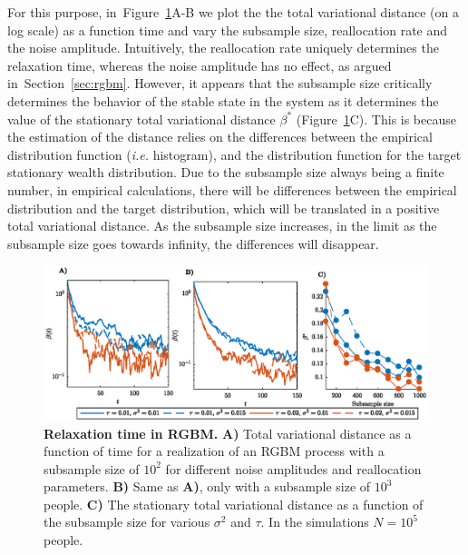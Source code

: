 \documentclass[11pt]{article}
\newcommand{\Sref}[1]{Section~\ref{sec:#1}}
\newcommand{\ie}{{\it i.e.}\xspace}
\newcommand{\Fref}[1]{Figure~\ref{fig:#1}}
\numberwithin{equation}{section}
\begin{document}
For this purpose, in~\Fref{rgbm-mixing-time}A-B we plot the the total variational distance (on a log scale)  as a function time and vary the subsample size, reallocation rate and the noise amplitude. Intuitively, the reallocation rate uniquely determines the relaxation time, whereas the noise amplitude has no effect, as argued in~\Sref{rgbm}. However, it appears that the subsample size critically determines the behavior of the stable state in the system as it determines the value of the stationary total variational distance $\beta^*$ (\Fref{rgbm-mixing-time}C). This is because the estimation of the distance relies on the differences between the empirical distribution function (\ie histogram), and the distribution function for the target stationary wealth distribution. Due to the subsample size always being a finite number, in empirical calculations, there will be differences between the empirical distribution and the target distribution, which will be translated in a positive total variational distance. As the subsample size increases, in the limit as the subsample size goes towards infinity, the differences will disappear.

\begin{figure}[!htb]
\centering
\includegraphics[width=1.0\textwidth]{figs/fig_mixing_time_rgbm.eps}
\caption{\textbf{Relaxation time in RGBM.} \textbf{A)} Total variational distance as a function of time for a realization of an RGBM process with a subsample size of $10^2$ for different noise amplitudes and reallocation parameters. \textbf{B)} Same as \textbf{A)}, only with a subsample size of $10^3$ people. \textbf{C)} The stationary total variational distance as a function of the subsample size for various $\sigma^2$ and $\tau$. In the simulations $N = 10^5$ people.\label{fig:rgbm-mixing-time}}
\end{figure}
\end{document}
